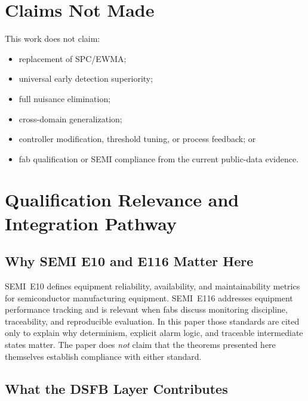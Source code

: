 \documentclass[11pt,letterpaper]{article}
\theoremstyle{scresult}
\begin{document}
\section{Claims Not Made}

This work does not claim:
\begin{itemize}
  \item replacement of SPC/EWMA;
  \item universal early detection superiority;
  \item full nuisance elimination;
  \item cross-domain generalization;
  \item controller modification, threshold tuning, or process feedback; or
  \item fab qualification or SEMI compliance from the current public-data evidence.
\end{itemize}

\section{Qualification Relevance and Integration Pathway}
\label{sec:certification}

\subsection{Why SEMI E10 and E116 Matter Here}

SEMI~E10 defines equipment reliability, availability, and maintainability
metrics for semiconductor manufacturing equipment. SEMI~E116 addresses
equipment performance tracking and is relevant when fabs discuss monitoring
discipline, traceability, and reproducible evaluation. In this paper those
standards are cited only to explain why determinism, explicit alarm logic, and
traceable intermediate states matter. The paper does \emph{not} claim that the
theorems presented here themselves establish compliance with either standard.

\subsection{What the DSFB Layer Contributes}
\end{document}
